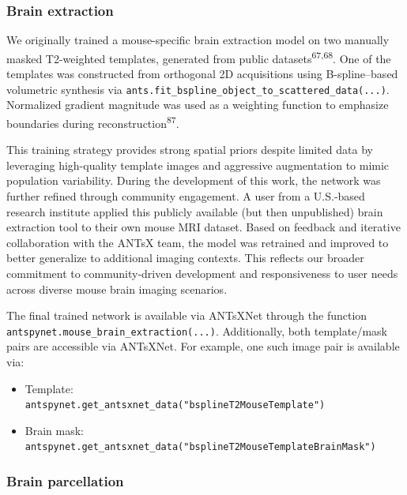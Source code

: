 \documentclass[
  12pt,
]{article}
\providecommand{\tightlist}{%
  \setlength{\itemsep}{0pt}\setlength{\parskip}{0pt}}
\begin{document}
\subsubsection{Brain extraction}\label{brain-extraction}

We originally trained a mouse-specific brain extraction model on two
manually masked T2-weighted templates, generated from public
datasets\textsuperscript{67,68}. One of the templates was constructed
from orthogonal 2D acquisitions using B-spline--based volumetric
synthesis via
\texttt{ants.fit\_bspline\_object\_to\_scattered\_data(...)}. Normalized
gradient magnitude was used as a weighting function to emphasize
boundaries during reconstruction\textsuperscript{87}.

This training strategy provides strong spatial priors despite limited
data by leveraging high-quality template images and aggressive
augmentation to mimic population variability. During the development of
this work, the network was further refined through community engagement.
A user from a U.S.-based research institute applied this publicly
available (but then unpublished) brain extraction tool to their own
mouse MRI dataset. Based on feedback and iterative collaboration with
the ANTsX team, the model was retrained and improved to better
generalize to additional imaging contexts. This reflects our broader
commitment to community-driven development and responsiveness to user
needs across diverse mouse brain imaging scenarios.

The final trained network is available via ANTsXNet through the
function\\
\texttt{antspynet.mouse\_brain\_extraction(...)}. Additionally, both
template/mask pairs are accessible via ANTsXNet. For example, one such
image pair is available via:

\begin{itemize}
\tightlist
\item
  Template:\\
  \texttt{antspynet.get\_antsxnet\_data("bsplineT2MouseTemplate")}
\item
  Brain mask:\\
  \texttt{antspynet.get\_antsxnet\_data("bsplineT2MouseTemplateBrainMask")}
\end{itemize}

\subsubsection{Brain parcellation}\label{brain-parcellation}
\end{document}
